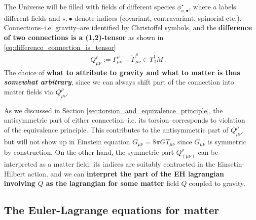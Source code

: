 \documentclass[../geometry_main.tex]{subfiles}
\begin{document}
\begin{mytheorem}
%
The Universe will be filled with fields of different species $\phi^\star_{a,\bullet}$, where $a$ labels different fields and $\star,\bullet$ denote indices (covariant, contravariant, spinorial etc.).
Connections--i.e. gravity--are identified by Christoffel symbols, and the \textbf{difference of two connections is a (1,2)-tensor} as shown in \eqref{eq:difference_connection_is_tensor}
\begin{align}
    Q^\rho_{\mu\nu} := \Gamma^\rho_{\mu\nu} - \tilde{\Gamma}^\rho_{\mu\nu} \in T_2^1M\,.
\end{align}
The choice of \textbf{what to attribute to gravity and what to matter is thus \emph{somewhat arbitrary}}, since we can always shift part of the connection into matter fields via $Q^\rho_{\mu\nu}$.

As we discussed in Section \ref{sec:torsion_and_equivalence_principle}, the  antisymmetric part of either connection--i.e. its torsion--corresponds to violation of the equivalence principle.
This contributes to the antisymmetric part of $Q^\rho_{\mu\nu}$, but will not show up in Einstein equation $G_{\mu\nu} = 8\pi G T_{\mu\nu}$ since $G_{\mu\nu}$ is symmetric by construction.
On the other hand, the symmetric part $Q^\rho_{(\mu\nu)}$ can be interpreted as a matter field: its indices are suitably contracted in the Einsetin-Hilbert action, and we can \textbf{interpret the part of the EH lagrangian involving $Q$ as the lagrangian for some matter} field $Q$ coupled to gravity.
%
\end{mytheorem}



\subsection{The Euler-Lagrange equations for matter}
\end{document}

